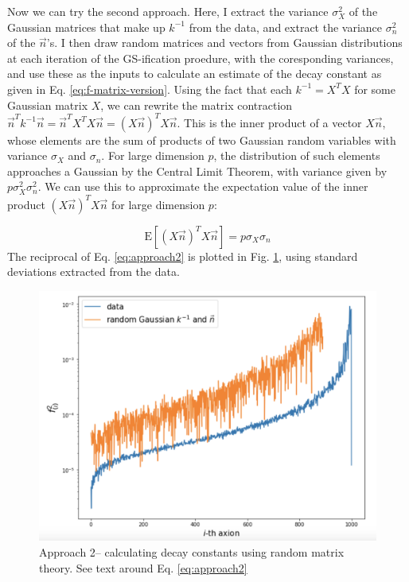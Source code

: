 \documentclass[11pt]{article}
\begin{document}
Now we can try the second approach. Here, I extract the variance $\sigma_X^2$ of the Gaussian matrices that make up $k^{-1}$ from the data, and extract the variance $\sigma_n^2$ of the $\vec{n}$'s. I then draw random matrices and vectors from Gaussian distributions at each iteration of the GS-ification proedure, with the coresponding variances, and use these as the inputs to calculate an estimate of the decay constant as given in Eq. \eqref{eq:f-matrix-version}. Using the fact that each $k^{-1}=X^TX$ for some Gaussian matrix $X$, we can rewrite the matrix contraction $\vec{n}^Tk^{-1}\vec{n}=\vec{n}^TX^TX\vec{n} = (X\vec{n})^TX\vec{n}$. This is the inner product of a vector $X\vec{n}$, whose elements are the sum of products of two Gaussian random variables with variance $\sigma_X$ and $\sigma_n$. For large dimension $p$, the distribution of such elements approaches a Gaussian by the Central Limit Theorem, with variance given by $p\sigma_X^2\sigma_n^2$. We can use this to approximate the expectation value of the inner product $(X\vec{n})^TX\vec{n}$ for large dimension $p$:

\begin{equation}
    \text{E}[(X\vec{n})^TX\vec{n}] = p\sigma_X\sigma_n
    \label{eq:approach2}
\end{equation}
The reciprocal of Eq. \eqref{eq:approach2} is plotted in Fig. \ref{fig:approach2}, using standard deviations extracted from the data.

\begin{figure}[h]
    \centering
    \includegraphics[width=0.8\linewidth]{figs/approach2.png}
    \caption{Approach 2– calculating decay constants using random matrix theory. See text around Eq. \eqref{eq:approach2}}
    \label{fig:approach2}
\end{figure}
\end{document}
